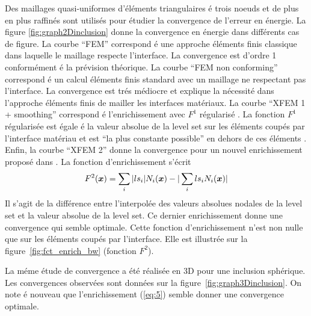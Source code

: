 Des maillages quasi-uniformes d'\'el\'ements
triangulaires \'e trois noeuds et de plus en plus raffin\'es sont
utilis\'es pour \'etudier la convergence de l'erreur
en \'energie. La figure \ref{fig:graph2Dinclusion} donne la
convergence  en \'energie dans diff\'erents cas de figure.
La courbe ``FEM'' correspond \'e une approche \'el\'ements finis
classique dans laquelle le maillage respecte l'interface.
La convergence est d'ordre 1 conform\'ement \'e la pr\'evision
th\'eorique. La courbe ``FEM non conforming'' correspond \'e un
calcul \'el\'ements finis standard avec un maillage ne respectant
pas l'interface. La convergence est tr\'es m\'ediocre et explique la
n\'ecessit\'e dans l'approche \'el\'ements finis de mailler les
interfaces
mat\'eriaux.
La courbe ``XFEM 1 + smoothing'' correspond \'e l'enrichissement
avec $F^1$ r\'egularis\'e .
La fonction  $F^1$ r\'egularis\'ee
est \'egale \'e  la valeur absolue de la level set sur les
\'el\'ements coup\'es par l'interface mat\'eriau et est
``la plus constante possible'' en dehors de ces
\'el\'ements \cite{Sukumar:inclusion}.
Enfin, la courbe ``XFEM 2'' donne la convergence pour un nouvel
enrichissement propos\'e dans \cite{MoesCloirec02}.
La fonction d'enrichissement s'\'ecrit
\begin{equation}
F^2(\mbox{\boldmath $x$}) = \sum_i  |ls_i| N_i(\mbox{\boldmath $x$})  - | \sum_i ls_i N_i(\mbox{\boldmath $x$}) |
\label{eq:5}
\end{equation}
Il s'agit de la diff\'erence entre l'interpol\'ee des valeurs
absolues nodales de la level set et la valeur absolue de la level
set.
Ce dernier enrichissement donne une convergence qui semble optimale.
Cette fonction d'enrichissement n'est non nulle que sur les
\'el\'ements coup\'es par l'interface. Elle est illustr\'ee sur la
figure~\ref{fig:fct_enrich_bw} (fonction $F^2$).






La m\'eme \'etude de convergence a \'et\'e r\'ealis\'ee en 3D pour une
inclusion sph\'erique.
Les convergences observ\'ees sont donn\'ees sur la
figure~\ref{fig:graph3Dinclusion}. On note \'e nouveau que
l'enrichissement (\ref{eq:5}) semble donner une convergence optimale.


